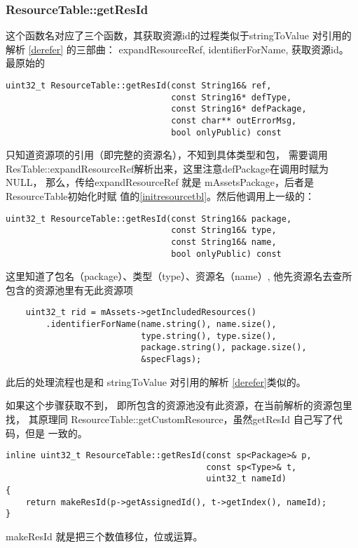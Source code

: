 \documentclass[a4paper,11pt]{article}
\begin{document}
\subsubsection{ResourceTable::getResId}\label{getresid}
 这个函数名对应了三个函数，其获取资源id的过程类似于stringToValue 对引用的解析
\cref{derefer} 的三部曲： expandResourceRef, identifierForName, 获取资源id。 
最原始的
\begin{lstlisting}
uint32_t ResourceTable::getResId(const String16& ref,
                                 const String16* defType,
                                 const String16* defPackage,
                                 const char** outErrorMsg,
                                 bool onlyPublic) const
\end{lstlisting}
只知道资源项的引用（即完整的资源名），不知到具体类型和包，
需要调用ResTable::expandResourceRef解析出来，这里注意defPackage在调用时赋为NULL，
那么，传给expandResourceRef 就是 mAssetsPackage，后者是ResourceTable初始化时赋
值的\cref{initresourcetbl}。然后他调用上一级的：
\begin{lstlisting}
uint32_t ResourceTable::getResId(const String16& package,
                                 const String16& type,
                                 const String16& name,
                                 bool onlyPublic) const
\end{lstlisting}
这里知道了包名（package）、类型（type）、资源名（name）,
他先资源名去查所包含的资源池里有无此资源项
\begin{lstlisting}
    uint32_t rid = mAssets->getIncludedResources()
        .identifierForName(name.string(), name.size(),
                           type.string(), type.size(),
                           package.string(), package.size(),
                           &specFlags);
\end{lstlisting}
此后的处理流程也是和 stringToValue 对引用的解析 \cref{derefer}类似的。

如果这个步骤获取不到， 即所包含的资源池没有此资源，在当前解析的资源包里找，
其原理同 ResourceTable::getCustomResource，虽然getResId 自己写了代码，但是
一致的。

\begin{lstlisting}
inline uint32_t ResourceTable::getResId(const sp<Package>& p,
                                        const sp<Type>& t,
                                        uint32_t nameId)
{
    return makeResId(p->getAssignedId(), t->getIndex(), nameId);
}
\end{lstlisting}
makeResId 就是把三个数值移位，位或运算。
\end{document}

